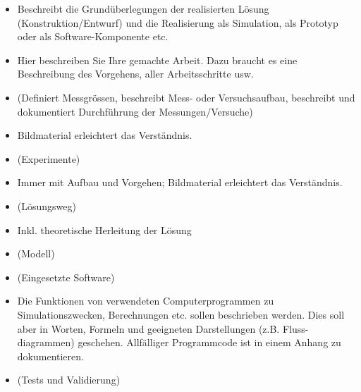 \begin{itemize}
    \item Beschreibt die Grundüberlegungen der realisierten Lösung (Konstruktion/Entwurf) und die Realisierung als Simulation, als Prototyp oder als Software-Komponente etc.
    \item Hier beschreiben Sie Ihre gemachte Arbeit. Dazu braucht es eine Beschreibung des Vorgehens, aller Arbeitsschritte usw.
    \item (Definiert Messgrössen, beschreibt Mess- oder Versuchsaufbau, beschreibt und dokumentiert Durchführung der Messungen/Versuche)
    \item Bildmaterial erleichtert das Verständnis.
    \item (Experimente)
    \item Immer mit Aufbau und Vorgehen; Bildmaterial erleichtert das Verständnis.
    \item (Lösungsweg)
    \item Inkl. theoretische Herleitung der Lösung
    \item (Modell)
    \item (Eingesetzte Software)
    \item Die Funktionen von verwendeten Computerprogrammen zu Simulationszwecken, Berechnungen etc. sollen beschrieben werden. Dies soll aber in Worten, Formeln und geeigneten Darstellungen (z.B. Fluss- diagrammen) geschehen. Allfälliger Programmcode ist in einem Anhang zu dokumentieren.
    \item (Tests und Validierung)
\end{itemize}

